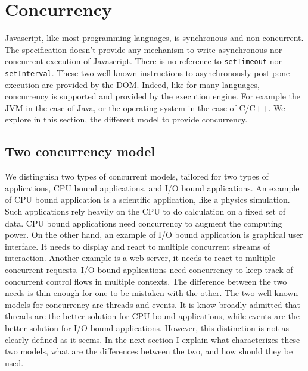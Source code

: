 \section{Concurrency}

Javascript, like most programming languages, is synchronous and non-concurrent. The specification doesn't provide any mechanism to write asynchronous nor concurrent execution of Javascript.
There is no reference to \texttt{setTimeout} nor \texttt{setInterval}.
These two well-known instructions to asynchronously post-pone execution are provided by the DOM.
Indeed, like for many languages, concurrency is supported and provided by the execution engine.
For example the JVM in the case of Java, or the operating system in the case of C/C++.
We explore in this section, the different model to provide concurrency.

\subsection{Two concurrency model}

We distinguish two types of concurrent models, tailored for two types of applications, CPU bound applications, and I/O bound applications.
An example of CPU bound application is a scientific application, like a physics simulation. Such applications rely heavily on the CPU to do calculation on a fixed set of data.
CPU bound applications need concurrency to augment the computing power.
On the other hand, an example of I/O bound application is graphical user interface.
It needs to display and react to multiple concurrent streams of interaction.
Another example is a web server, it needs to react to multiple concurrent requests.
I/O bound applications need concurrency to keep track of concurrent control flows in multiple contexts.
The difference between the two needs is thin enough for one to be mistaken with the other.
The two well-known models for concurrency are threads and events.
It is know broadly admitted that threads are the better solution for CPU bound applications, while events are the better solution for I/O bound applications.
However, this distinction is not as clearly defined as it seems.
In the next section I explain what characterizes these two models, what are the differences between the two, and how should they be used.

